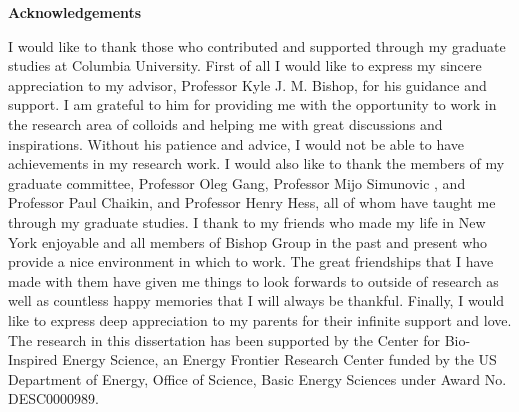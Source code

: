
\clearpage
\begin{center}

\vspace*{5\baselineskip}
\textbf{\large Acknowledgements}
\end{center}


\begin{flushleft}
\hspace{10mm}I would like to thank those who contributed and supported through my graduate studies at
Columbia University. First of all I would like to express my sincere appreciation to
my advisor, Professor Kyle J. M. Bishop, for his guidance and support. I am grateful to him for
providing me with the opportunity to work in the research area of colloids and helping me with
great discussions and inspirations. Without his patience and advice, I would not be able to have
achievements in my research work. I would also like to thank the members of my graduate
committee, Professor Oleg Gang, Professor Mijo Simunovic , and Professor Paul Chaikin, and Professor Henry Hess, all of whom have taught me through my graduate studies.
 I thank to my friends who made my life in New York enjoyable and all members of
Bishop Group in the past and present who provide a nice environment in which to work. The
great friendships that I have made with them have given me things to look forwards to outside of
research as well as countless happy memories that I will always be thankful. Finally, I would like
to express deep appreciation to my parents for their infinite support and love.
 The research in this dissertation has been supported by the Center
for Bio-Inspired Energy Science, an Energy Frontier Research
Center funded by the US Department of Energy, Office
of Science, Basic Energy Sciences under Award No. DESC0000989. 
\end{flushleft}
\clearpage



